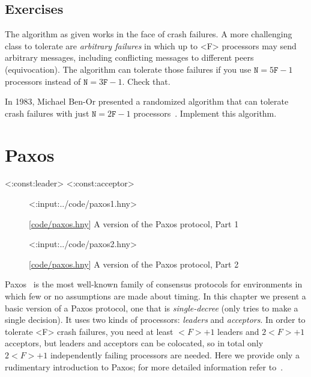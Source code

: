 \documentclass{report}
\newcommand{\harmonylink}[1]{%
[\href{https://harmony.cs.cornell.edu/#1}{\underline{#1}}]%
}
\newenvironment{code}{
\tcolorbox
}{
\endtcolorbox
}
\begin{document}
\section*{Exercises}
\begin{problems}
\item The algorithm as given works in the face of crash failures.
A more challenging class to tolerate are \emph{arbitrary failures} in
which up to <{F}> processors may send arbitrary messages, including
conflicting messages to different peers (equivocation).
The algorithm can tolerate those failures if you use $\mathtt{N} = 5\mathtt{F} - 1$ processors instead of $\mathtt{N} = 3\mathtt{F} - 1$.  Check that.
\item In 1983, Michael Ben-Or presented a randomized algorithm that can
tolerate crash failures with
just $\mathtt{N} = 2\mathtt{F} - 1$ processors~\cite{BenOr83}.
Implement this algorithm.
\end{problems}

\chapter{Paxos}
\label{ch:paxos}

<{:const:leader}>
<{:const:acceptor}>

\begin{figure}
\begin{code}
<{:input:../code/paxos1.hny}>
\end{code}
\caption{\harmonylink{code/paxos.hny} A version of the Paxos protocol, Part 1}
\label{fig:paxos1}
\end{figure}

\begin{figure}
\begin{code}
<{:input:../code/paxos2.hny}>
\end{code}
\caption{\harmonylink{code/paxos.hny} A version of the Paxos protocol, Part 2}
\label{fig:paxos2}
\end{figure}

Paxos~\cite{Paxos} is the most well-known family of consensus protocols for
environments in which few or no assumptions are made about timing.
In this chapter we present a basic version of a Paxos protocol, one that is
\emph{single-decree} (only tries to make a single decision).
It uses two kinds of processors: \emph{leaders} and \emph{acceptors}.
In order to tolerate <{F}> crash failures, you need at least $<{F}>+1$ leaders
and $2<{F}> + 1$ acceptors, but leaders and acceptors can be colocated, so
in total only $2<{F}> + 1$ independently failing processors are needed.
Here we provide only a rudimentary introduction to Paxos; for more detailed
information refer to~\cite{Paxos}.
\end{document}
